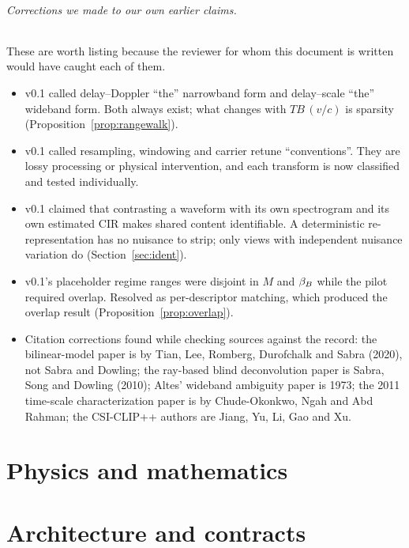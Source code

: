 \documentclass[11pt,a4paper]{article}
\begin{document}
\paragraph{Corrections we made to our own earlier claims.} These are worth listing because the reviewer for whom this document is written would have caught each of them.
\begin{itemize}
\item v0.1 called delay--Doppler ``the'' narrowband form and delay--scale ``the'' wideband form. Both always exist; what changes with $TB\,(v/c)$ is sparsity (Proposition~\ref{prop:rangewalk}).
\item v0.1 called resampling, windowing and carrier retune ``conventions''. They are lossy processing or physical intervention, and each transform is now classified and tested individually.
\item v0.1 claimed that contrasting a waveform with its own spectrogram and its own estimated CIR makes shared content identifiable. A deterministic re-representation has no nuisance to strip; only views with independent nuisance variation do (Section~\ref{sec:ident}).
\item v0.1's placeholder regime ranges were disjoint in $M$ and $\beta_{B}$ while the pilot required overlap. Resolved as per-descriptor matching, which produced the overlap result (Proposition~\ref{prop:overlap}).
\item Citation corrections found while checking sources against the record: the bilinear-model paper is by Tian, Lee, Romberg, Durofchalk and Sabra (2020), not Sabra and Dowling; the ray-based blind deconvolution paper is Sabra, Song and Dowling (2010); Altes' wideband ambiguity paper is 1973; the 2011 time-scale characterization paper is by Chude-Okonkwo, Ngah and Abd Rahman; the CSI-CLIP++ authors are Jiang, Yu, Li, Gao and Xu.
\end{itemize}

\part{Physics and mathematics}


\part{Architecture and contracts}
\end{document}
